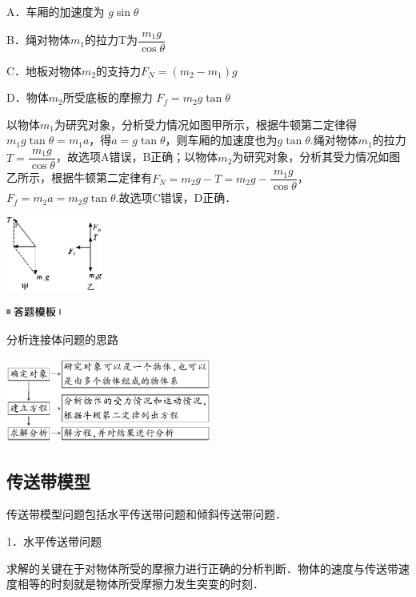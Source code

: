 A．车厢的加速度为 $g\sin\theta$

B．绳对物体$m_1$的拉力T为$\dfrac{m_1g}{\cos\theta}$

C．地板对物体$m_2$的支持力$F_N=(m_2-m_1)g$

D．物体$m_2$所受底板的摩擦力 $F_f=m_2g\tan\theta$
\begin{solution}
	以物体$m_1$为研究对象，分析受力情况如图甲所示，根据牛顿第二定律得$m_1g\tan\theta=m_1a$，得$a=g\tan \theta$，则车厢的加速度也为$g\tan\theta$.绳对物体$m_1$的拉力$T=\dfrac{m_1g}{\cos\theta}$，故选项A错误，B正确；以物体$m_2$为研究对象，分析其受力情况如图乙所示，根据牛顿第二定律有$F_N=m_2g-T=m_2g-\dfrac{m_1g}{\cos\theta}$，$F_f=m_2a=m_2g\tan\theta$.故选项C错误，D正确．
\end{solution}


\begin{center}\includegraphics[width=1.23958in,height=0.94792in]{media/image120.png}\end{center}
\begin{center}\includegraphics[width=0.70833in,height=0.125in]{media/image25.png}\end{center}
分析连接体问题的思路

\begin{center}\includegraphics[width=2.65625in,height=1.08333in]{media/image121.png}\end{center}
\subsection{传送带模型}

传送带模型问题包括水平传送带问题和倾斜传送带问题．

1．水平传送带问题

求解的关键在于对物体所受的摩擦力进行正确的分析判断．物体的速度与传送带速度相等的时刻就是物体所受摩擦力发生突变的时刻．

